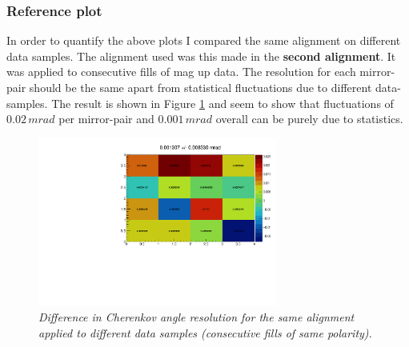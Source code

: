 \subsubsection{Reference plot}
In order to quantify the above plots I compared the same alignment on different data samples. The alignment used was this made in the \textbf{second alignment}. It was applied to consecutive fills of mag up data. The resolution for each mirror-pair should be the same apart from statistical fluctuations due to different data-samples. The result is shown in Figure \ref{fig:rich1magup} and seem to show that fluctuations of $0.02\, mrad$ per mirror-pair and $0.001\, mrad$ overall can be purely due to statistics.\\
\begin{figure}[!h]
	\vspace*{-0.cm}
	\begin{center}
		\includegraphics[width=0.7\textwidth]{del_rich1_magup.pdf}
		\vspace*{-0.5cm}
	\end{center}
	\caption{\textit{Difference in Cherenkov angle resolution for the same alignment applied to different data samples (consecutive fills of same polarity). }}
	\label{fig:rich1magup}
\end{figure}

